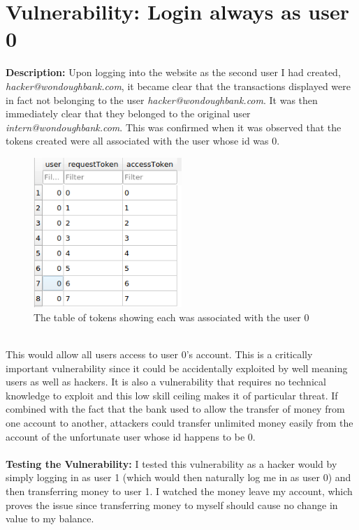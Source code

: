 \section{Vulnerability: Login always as user 0}
\label{sec:background}
\textbf{Description:} Upon logging into the website as the second user I had created, \textit{hacker@wondoughbank.com}, it became clear that the transactions displayed were in fact
not belonging to the user \textit{hacker@wondoughbank.com}. It was then immediately clear that they belonged to the original user \textit{intern@wondoughbank.com}. This was confirmed
when it was observed that the tokens created were all associated with the user whose id was 0.
\begin{figure}[h]
   \centering
   \includegraphics[width=0.5\textwidth]{figs/token1.png}
   \caption{The table of tokens showing each was associated with the user 0}
   \label{figvun6a}
 \end{figure}\\
This would allow all users access to user 0's account. This is a critically important vulnerability since it could be accidentally exploited by well meaning users as well as hackers.
It is also a vulnerability that requires no technical knowledge to exploit and this low skill ceiling makes it of particular threat. If combined with the fact that the bank used
to allow the transfer of money from one account to another, attackers could transfer unlimited money easily from the account of the unfortunate user whose id happens to be 0.\\ \\
\textbf{Testing the Vulnerability:} I tested this vulnerability as a hacker would by simply logging in as user 1 (which would then naturally log me in as user 0) and then
transferring money to user 1. I watched the money leave my account, which proves the issue since transferring money to myself should cause no change in value to my balance.
